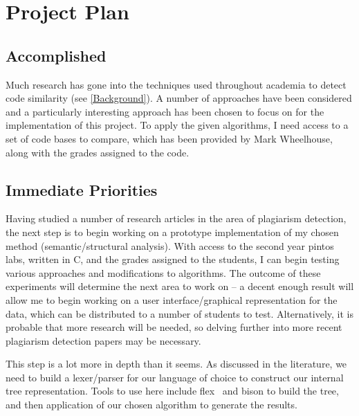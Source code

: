 
\chapter{Project Plan} %

\label{ProjectPlan} %


\section{Accomplished}

Much research has gone into the techniques used throughout academia to detect 
code similarity (see \ref{Background}). A number of approaches have been considered
and a particularly interesting approach has been chosen to focus on for the 
implementation of this project. To apply the given algorithms, I need access to
a set of code bases to compare, which has been provided by Mark Wheelhouse, along
with the grades assigned to the code.

\section{Immediate Priorities}

Having studied a number of research articles in the area of plagiarism detection,
the next step is to begin working on a prototype implementation of my chosen
method (semantic/structural analysis). With access to the second year pintos labs,
written in C, and the grades assigned to the students, I can begin testing various
approaches and modifications to algorithms. The outcome of these experiments will
determine the next area to work on -- a decent enough result will allow me to
begin working on a user interface/graphical representation for the data, which
can be distributed to a number of students to test. Alternatively, it is probable
that more research will be needed, so delving further into more recent plagiarism
detection papers may be necessary.

This step is a lot more in depth than it seems. As discussed in the literature,
we need to build a lexer/parser for our language of choice to construct our
internal tree representation. Tools to use here include flex~\cite{flex} and bison
\cite{bison} to build the tree, and then application of our chosen algorithm
to generate the results.

